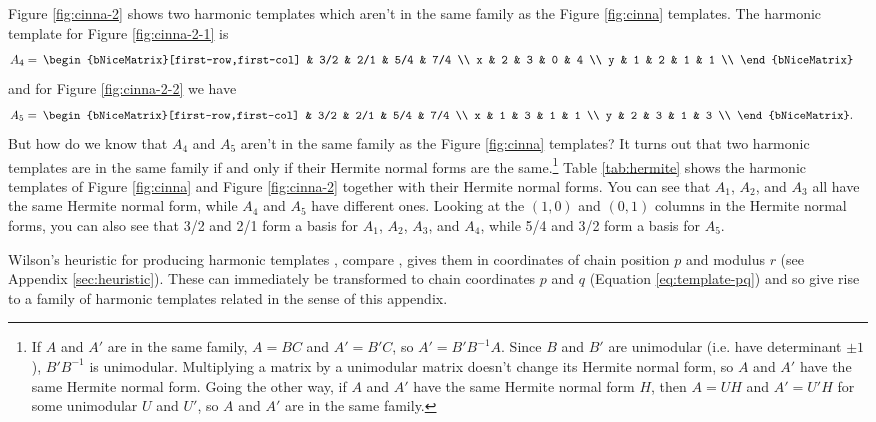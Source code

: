 \documentclass[a4paper,11pt]{article}
\newcommand\matspace{\:}
\begin{document}
Figure \ref{fig:cinna-2} shows two harmonic templates which aren't in the same
family as the Figure \ref{fig:cinna} templates. The harmonic template for
Figure \ref{fig:cinna-2-1} is
\begin{align}
A_4 &=\matspace
\begin{bNiceMatrix}[first-row,first-col]
    &   3/2 &   2/1 &   5/4 &   7/4 \\
x   &   2   &   3   &   0   &   4   \\
y   &   1   &   2   &   1   &   1   \\
\end{bNiceMatrix}
\end{align}
and for Figure \ref{fig:cinna-2-2} we have
\begin{align}
A_5 &=\matspace
\begin{bNiceMatrix}[first-row,first-col]
    &   3/2 &   2/1 &   5/4 &   7/4 \\
x   &   1   &   3   &   1   &   1   \\
y   &   2   &   3   &   1   &   3   \\
\end{bNiceMatrix}.
\end{align}
But how do we know that $A_4$ and $A_5$ aren't in the same family as the Figure
\ref{fig:cinna} templates? It turns out that two harmonic templates are in the
same family if and only if their Hermite normal forms
\cite{schrijver1998theory, newman1972integral} are the same.\footnote{If $A$
and $A'$ are in the same family, $A = BC$ and $A' = B'C$,
so $A' = B' B^{-1} A$. Since $B$ and $B'$ are unimodular (i.e. have determinant
$\pm1$), $B' B^{-1}$ is unimodular. Multiplying a matrix by a unimodular matrix
doesn't change its Hermite normal form, so $A$ and $A'$ have the same Hermite
normal form.  Going the other way, if $A$ and $A'$ have the same Hermite normal
form $H$, then $A = UH$ and $A' = U'H$ for some unimodular $U$ and $U'$, so $A$
and $A'$ are in the same family.
} Table \ref{tab:hermite} shows the harmonic templates of Figure
\ref{fig:cinna} and Figure \ref{fig:cinna-2} together with their Hermite normal
forms. You can see that $A_1$, $A_2$, and $A_3$ all have the same Hermite
normal form, while $A_4$ and $A_5$ have different ones. Looking at the $(1, 0)$
and $(0, 1)$ columns in the Hermite normal forms, you can also see that 3/2 and
2/1 form a basis for $A_1$, $A_2$, $A_3$, and $A_4$, while 5/4 and 3/2 form a
basis for $A_5$.

Wilson's heuristic for producing harmonic templates \cite{wilsonharmonic},
compare \cite[38]{wilsonhebdomekontany}, gives them in coordinates of chain
position $p$ and modulus $r$ (see Appendix \ref{sec:heuristic}). These can
immediately be transformed to chain coordinates $p$ and $q$ (Equation
\ref{eq:template-pq}) and so give rise to a family of harmonic templates
related in the sense of this appendix.
\end{document}
